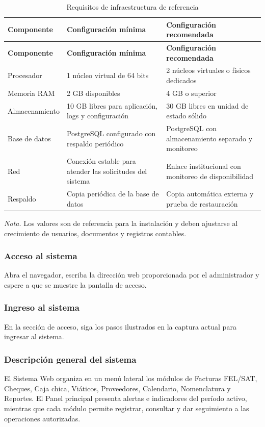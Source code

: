 \begin{longtable}{p{4.0cm}p{4.3cm}p{4.3cm}}
\caption{Requisitos de infraestructura de referencia}\label{tab:A_requisitos_sistema}\\
\toprule
\textbf{Componente} & \textbf{Configuración mínima} & \textbf{Configuración recomendada}\\
\midrule
\endfirsthead
\toprule
\textbf{Componente} & \textbf{Configuración mínima} & \textbf{Configuración recomendada}\\
\midrule
\endhead
\endfoot
\bottomrule
\endlastfoot
Procesador & 1 núcleo virtual de 64 bits & 2 núcleos virtuales o físicos dedicados\\
Memoria RAM & 2 GB disponibles & 4 GB o superior\\
Almacenamiento & 10 GB libres para aplicación, logs y configuración & 30 GB libres en unidad de estado sólido\\
Base de datos & PostgreSQL configurado con respaldo periódico & PostgreSQL con almacenamiento separado y monitoreo\\
Red & Conexión estable para atender las solicitudes del sistema & Enlace institucional con monitoreo de disponibilidad\\
Respaldo & Copia periódica de la base de datos & Copia automática externa y prueba de restauración\\
\end{longtable}

\textit{Nota.} Los valores son de referencia para la instalación y deben ajustarse al crecimiento de usuarios, documentos y registros contables.

\subsubsection{Acceso al sistema}
Abra el navegador, escriba la dirección web proporcionada por el administrador y espere a que se muestre la pantalla de acceso.

\subsubsection{Ingreso al sistema}
En la sección de acceso, siga los pasos ilustrados en la captura actual para ingresar al sistema.

\subsubsection{Descripción general del sistema}
El Sistema Web organiza en un menú lateral los módulos de Facturas FEL/SAT, Cheques, Caja chica, Viáticos, Proveedores, Calendario, Nomenclatura y Reportes. El Panel principal presenta alertas e indicadores del período activo, mientras que cada módulo permite registrar, consultar y dar seguimiento a las operaciones autorizadas.

